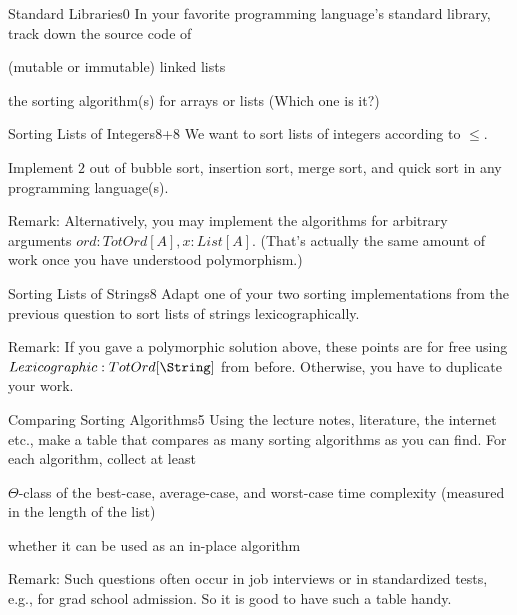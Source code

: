 \documentclass[a4paper]{article}
\begin{document}
\header

\begin{problem}{Standard Libraries}{0}
In your favorite programming language's standard library, track down the source code of
\begin{compactitem}
 \item (mutable or immutable) linked lists
 \item the sorting algorithm(s) for arrays or lists (Which one is it?)
\end{compactitem}
\end{problem}

\begin{problem}{Sorting Lists of Integers}{8+8}
We want to sort lists of integers according to $\leq$.

Implement $2$ out of bubble sort, insertion sort, merge sort, and quick sort in any programming language(s).
\medskip

Remark: Alternatively, you may implement the algorithms for arbitrary arguments $ord:TotOrd[A], x:List[A]$.
(That's actually the same amount of work once you have understood polymorphism.)
\end{problem}

\begin{problem}{Sorting Lists of Strings}{8}
Adapt one of your two sorting implementations from the previous question to sort lists of strings lexicographically.
\medskip

Remark: If you gave a polymorphic solution above, these points are for free using $Lexicographic:TotOrd[\String]$ from before.
Otherwise, you have to duplicate your work.
\end{problem}

\begin{problem}{Comparing Sorting Algorithms}{5}
Using the lecture notes, literature, the internet etc., make a table that compares as many sorting algorithms as you can find.
For each algorithm, collect at least
\begin{compactitem}
 \item $\Theta$-class of the best-case, average-case, and worst-case time complexity (measured in the length of the list)
 \item whether it can be used as an in-place algorithm
\end{compactitem}
\medskip

Remark: Such questions often occur in job interviews or in standardized tests, e.g., for grad school admission.
So it is good to have such a table handy.
\end{problem}
\end{document}

